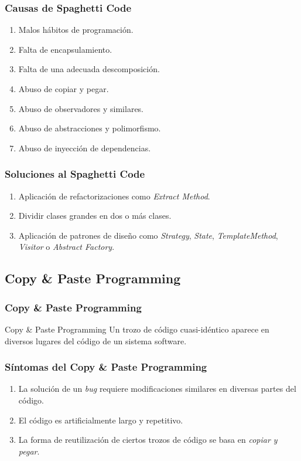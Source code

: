 ﻿\documentclass[animated,a4paper,slidestop,xcolor=pst,blue]{beamer}
\begin{document}
\begin{frame}[c]
	\frametitle{Causas de Spaghetti Code}
    \begin{enumerate}[<+->]
        \item Malos hábitos de programación.
        \item Falta de encapsulamiento.
        \item Falta de una adecuada descomposición.
        \item Abuso de copiar y pegar.
        \item Abuso de observadores y similares.
        \item Abuso de abstracciones y polimorfismo.
        \item Abuso de inyección de dependencias.
    \end{enumerate}
\end{frame}

\begin{frame}[c]
    \frametitle{Soluciones al Spaghetti Code}
    \begin{enumerate}[<+->]
        \item Aplicación de refactorizaciones como \emph{Extract Method}.
        \item Dividir clases grandes en dos o más clases.
        \item Aplicación de patrones de diseño como \emph{Strategy}, \emph{State}, \emph{TemplateMethod}, \emph{Visitor} o \emph{Abstract Factory}.
    \end{enumerate}
\end{frame}

\subsection{Copy \& Paste Programming}

\begin{frame}
	\frametitle{Copy \& Paste Programming}
	\begin{block}{Copy \& Paste Programming}
		Un trozo de código cuasi-idéntico aparece en diversos lugares del código de un sistema software.
	\end{block}
\end{frame}

\begin{frame}[c]
    \frametitle{Síntomas del Copy \& Paste Programming}
    \begin{enumerate}[<+->]
        \item La solución de un \emph{bug} requiere modificaciones similares en diversas partes del código.
        \item El código es artificialmente largo y repetitivo.
        \item La forma de reutilización de ciertos trozos de código se basa en \emph{copiar y pegar}.
    \end{enumerate}
\end{frame}
\end{document}
